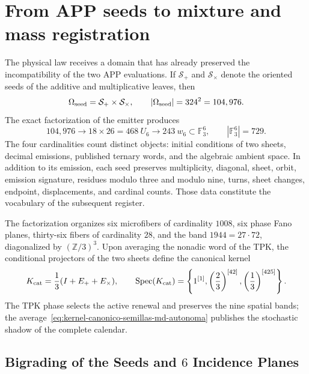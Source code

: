 \section{From APP seeds to mixture and mass registration}
\label{sec:semillas-registro-mezcla-autonoma}

The physical law receives a domain that has already preserved the incompatibility of
the two APP evaluations. If
\(\mathcal S_+\) and \(\mathcal S_\times\) denote the oriented seeds of
the additive and multiplicative leaves, then
\begin{equation}
 \Omega_{\rm seed}=\mathcal S_+\times\mathcal S_\times,
 \qquad
 |\Omega_{\rm seed}|=324^2=104,976.
 \label{eq:dominio-semillas-md-autonoma}
\end{equation}
The exact factorization of the emitter produces
\begin{equation}
 104,976
 \longrightarrow18\times26=468\ U_6
 \longrightarrow243\ w_6\subset\mathbb F_3^6,
 \qquad |\mathbb F_3^6|=729.
 \label{eq:embudo-semillas-md-autonoma}
\end{equation}
The four cardinalities count distinct objects: initial conditions of
two sheets, decimal emissions, published ternary words, and the algebraic
ambient space. In addition to its emission, each seed preserves multiplicity,
diagonal, sheet, orbit, emission signature, residues modulo three and modulo
nine, turns, sheet changes, endpoint, displacements, and cardinal
counts. Those data constitute the vocabulary of the subsequent register.

The factorization organizes six microfibers of cardinality \(1008\), six phase
Fano planes, thirty-six fibers of cardinality \(28\), and the band
\(1944=27\cdot72\), diagonalized by \((\mathbb Z/3)^3\). Upon averaging the
nonadic word of the TPK, the conditional projectors of the two sheets
define the canonical kernel
\begin{equation}
 K_{\rm cat}=\frac13(I+E_++E_\times),
 \qquad
 \operatorname{Spec}(K_{\rm cat})
 =\left\{1^{[1]},
 \left(\frac23\right)^{[42]},
 \left(\frac13\right)^{[425]}\right\}.
 \label{eq:kernel-canonico-semillas-md-autonoma}
\end{equation}
The TPK phase selects the active renewal and preserves the nine
spatial bands; the average~\eqref{eq:kernel-canonico-semillas-md-autonoma}
publishes the stochastic shadow of the complete calendar.

\subsection{Bigrading of the Seeds and \(6\) Incidence Planes}

